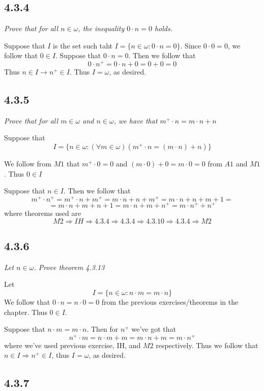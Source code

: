 \documentclass[11pt,oneside,titlepage]{book}
\DeclareMathOperator \ra {\Rightarrow}
\begin{document}
\subsection*{4.3.4}

\textit{Prove that for all $n \in \omega$, the inequality $0 \cdot n = 0$ holds.}

Suppose that $I$ is the set such taht
$I = \{n \in \omega: 0 \cdot n = 0\}$.
Since $0 \cdot 0 = 0$, we follow that $0 \in I$. Suppose that $0 \cdot n = 0$. Then we follow that
$$0 \cdot n^+ = 0 \cdot n + 0 = 0 + 0 = 0$$
Thus $n \in I \to n^+ \in I$. Thus $I = \omega$, as desired.


\subsection*{4.3.5}

\textit{Prove that for all $m \in \omega$ and $n \in \omega$, we have that
  $m^+ \cdot n  = m \cdot n + n$}

Suppose that
$$I = \{n \in \omega: (\forall m \in \omega)(m^+ \cdot n  = (m \cdot n) + n)\}$$

We follow from $M1$ that $m^+ \cdot 0 = 0$  and $(m \cdot 0) + 0 = m \cdot 0 = 0$
from $A1$ and $M1$. Thus $0 \in I$

Suppose that $n \in I$. Then we follow that
$$m^+ \cdot n^+ = m^+ \cdot n + m^+ = m \cdot n + n + m^+ = m \cdot n + n + m + 1 = $$
$$= m \cdot n + m + n + 1  = m \cdot n + m + n^+ = m \cdot n^+ + n^+$$
where theorems used are
$$M2 \ra IH \ra 4.3.4 \ra 4.3.4 \ra  4.3.10 \ra 4.3.4 \ra M2$$

\subsection*{4.3.6}

\textit{Let $n \in \omega$. Prove theorem 4.3.13}

Let
$$I = \{n \in \omega: n \cdot m = m \cdot n\}$$
We follow that $0 \cdot n = n \cdot 0 = 0$ from the previous exercises/theorems in the
chapter. Thus $0 \in I$.

Suppose that $n \cdot m = m \cdot n$. Then for $n^+$ we've got that
$$n^+ \cdot m = n \cdot m + m = m \cdot n + m = m \cdot n^+$$
where we've used previous exercise, IH, and $M2$ respectively. Thus we follow that
$n \in I \ra n^+ \in I$, thus $I = \omega$, as desired.

\subsection*{4.3.7}
\end{document}
